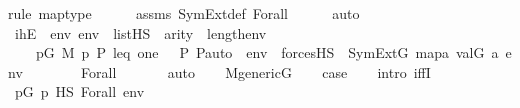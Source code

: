 \begin{isabellebody}
{\isacharparenleft}{\kern0pt}rule\ map{\isacharunderscore}{\kern0pt}type{\isacharparenright}{\kern0pt}\isanewline
\ \ \ \ \isamarkupfalse%
\ assms\ SymExt{\isacharunderscore}{\kern0pt}def\ Forall\isanewline
\ \ \ \ \isamarkupfalse%
\ auto\isanewline
\isanewline
\ \ \isamarkupfalse%
\ ihE\ {\isacharcolon}{\kern0pt}\ {\isachardoublequoteopen}{\isasymAnd}env{\isachardot}{\kern0pt}\ env\ {\isasymin}\ list{\isacharparenleft}{\kern0pt}HS{\isacharparenright}{\kern0pt}\ {\isasymLongrightarrow}\ arity{\isacharparenleft}{\kern0pt}{\isasymphi}{\isacharparenright}{\kern0pt}\ {\isasymle}\ length{\isacharparenleft}{\kern0pt}env{\isacharparenright}{\kern0pt}\ {\isasymLongrightarrow}\isanewline
\ \ \ \ {\isacharparenleft}{\kern0pt}{\isasymexists}p{\isasymin}G{\isachardot}{\kern0pt}\ M{\isacharcomma}{\kern0pt}\ {\isacharbrackleft}{\kern0pt}p{\isacharcomma}{\kern0pt}\ P{\isacharcomma}{\kern0pt}\ leq{\isacharcomma}{\kern0pt}\ one{\isacharcomma}{\kern0pt}\ {\isasymlangle}{\isasymF}{\isacharcomma}{\kern0pt}\ {\isasymG}{\isacharcomma}{\kern0pt}\ P{\isacharcomma}{\kern0pt}\ P{\isacharunderscore}{\kern0pt}auto{\isasymrangle}{\isacharbrackright}{\kern0pt}\ {\isacharat}{\kern0pt}\ env\ {\isasymTurnstile}\ forcesHS{\isacharparenleft}{\kern0pt}{\isasymphi}{\isacharparenright}{\kern0pt}{\isacharparenright}{\kern0pt}\ {\isasymlongleftrightarrow}\ SymExt{\isacharparenleft}{\kern0pt}G{\isacharparenright}{\kern0pt}{\isacharcomma}{\kern0pt}\ map{\isacharparenleft}{\kern0pt}{\isasymlambda}a{\isachardot}{\kern0pt}\ val{\isacharparenleft}{\kern0pt}G{\isacharcomma}{\kern0pt}\ a{\isacharparenright}{\kern0pt}{\isacharcomma}{\kern0pt}\ env{\isacharparenright}{\kern0pt}\ {\isasymTurnstile}\ {\isasymphi}{\isachardoublequoteclose}\isanewline
\ \ \ \ \isamarkupfalse%
\ Forall\ \isanewline
\ \ \ \ \isamarkupfalse%
\ auto\isanewline
\isanewline
\ \ \isamarkupfalse%
\ {\isacartoucheopen}M{\isacharunderscore}{\kern0pt}generic{\isacharparenleft}{\kern0pt}G{\isacharparenright}{\kern0pt}{\isacartoucheclose}\isanewline
\ \ \isamarkupfalse%
\ {\isacharquery}{\kern0pt}case\isanewline
\ \ \isamarkupfalse%
\ {\isacharparenleft}{\kern0pt}intro\ iffI{\isacharparenright}{\kern0pt}\isanewline
\ \ \ \ \isamarkupfalse%
\ {\isachardoublequoteopen}{\isasymexists}p{\isasymin}G{\isachardot}{\kern0pt}\ {\isacharparenleft}{\kern0pt}p\ {\isasymtturnstile}HS\ Forall{\isacharparenleft}{\kern0pt}{\isasymphi}{\isacharparenright}{\kern0pt}\ env{\isacharparenright}{\kern0pt}{\isachardoublequoteclose}\isanewline

\end{isabellebody}
